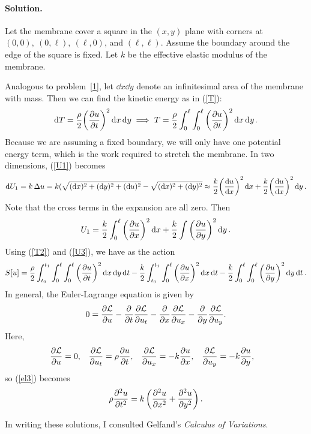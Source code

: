 \documentclass[11pt]{article}
\newcommand{\refeq}[1]{(\ref{#1})}
\newenvironment{solution}
{
    \paragraph{Solution.}
    \ignorespaces
}
{
}
\begin{document}
\begin{solution}
	Let the membrane cover a square in the $(x, y)$ plane with corners at $(0, 0),\ (0, \ell),\ (\ell, 0)$, and $(\ell, \ell)$.  Assume the boundary around the edge of the square is fixed.  Let $k$ be the effective elastic modulus of the membrane.
	
	Analogous to problem~\ref{1}, let $\dd{x} \dd{y}$ denote an infinitesimal area of the membrane with mass.  Then we can find the kinetic energy as in \refeq{T}:
	\begin{equation} \label{T2}
		\dd{T} = \frac{\rho}{2} \bigg( \pdv{u}{t} \bigg)^2 \dd{x} \dd{y} \implies T = \frac{\rho}{2} \int_0^\ell \int_0^\ell \bigg( \pdv{u}{t} \bigg)^2 \dd{x} \dd{y}.
	\end{equation}
	Because we are assuming a fixed boundary, we will only have one potential energy term, which is the work required to stretch the membrane.  In two dimensions, \refeq{U1} becomes
	\begin{equation}
		\dd{U_1} = k \,\Delta u = k (\sqrt{(\dd{x})^2 + (\dd{y})^2 + (\dd{u})^2} - \sqrt{(\dd{x})^2 + (\dd{y})^2} \approx \frac{k}{2} \bigg( \dv{u}{x} \bigg)^2 \dd{x} + \frac{k}{2} \bigg( \dv{u}{x} \bigg)^2 \dd{y}.
	\end{equation}
	Note that the cross terms in the expansion are all zero.  Then
	\begin{equation} \label{U3}
		U_1 = \frac{k}{2} \int_0^\ell \bigg( \pdv{u}{x} \bigg)^2 \dd{x} + \frac{k}{2} \int \bigg( \pdv{u}{y} \bigg)^2 \dd{y}.
	\end{equation}
	Using \refeq{T2} and \refeq{U3}, we have as the action
	\begin{equation}
		S[u] = \frac{\rho}{2} \int_{t_0}^{t_1} \int_0^\ell \int_0^\ell \bigg( \pdv{u}{t} \bigg)^2 \dd{x} \dd{y} \dd{t} - \frac{k}{2} \int_{t_0}^{t_1} \int_0^\ell \bigg( \pdv{u}{x} \bigg)^2 \dd{x} \dd{t} - \frac{k}{2} \int_0^\ell \int_0^\ell \bigg( \pdv{u}{y} \bigg)^2 \dd{y} \dd{t}.
	\end{equation}
	In general, the Euler-Lagrange equation is given by
	\begin{equation} \label{el3}
		0 = \pdv{\mathcal{L}}{u} - \pdv{t} \pdv{\mathcal{L}}{u_t} - \pdv{x} \pdv{\mathcal{L}}{u_x} - \pdv{y} \pdv{\mathcal{L}}{u_y}.
	\end{equation}
	Here,
	\begin{align}
		\pdv{\mathcal{L}}{u} &= 0, &
		\pdv{\mathcal{L}}{u_t} &= \rho \pdv{u}{t}, &
		\pdv{\mathcal{L}}{u_x} &= -k \pdv{u}{x}, &
		\pdv{\mathcal{L}}{u_y} &= -k \pdv{u}{y},
	\end{align}
	so \refeq{el3} becomes
	\begin{equation}
		\rho \pdv[2]{u}{t} = k \left( \pdv[2]{u}{x} + \pdv[2]{u}{y} \right).
	\end{equation}
\end{solution}
	


In writing these solutions, I consulted Gelfand's \emph{Calculus of Variations}.
\end{document}
